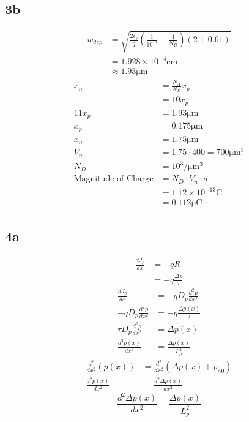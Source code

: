 \documentclass{article}
\begin{document}
\begin{multicols}{2}
    \subsection*{3b}
    \begin{align*}
        w_{dep} & = \sqrt{\frac{2\epsilon_s}{q}\left({\frac{1}{10^{10}}+\frac{1}{N_D}}\right)\left(2+0.61\right)} \\
                & = 1.928\times10^{-4}\si{\centi\metre}                                                           \\
                & \approx 1.93 \si{\micro\metre}
    \end{align*}
    \begin{align*}
        x_n                        & = \frac{N_A}{N_D}x_p                          \\
                                   & = 10 x_p                                      \\
        11x_p                      & = 1.93 \si{\micro\metre}                      \\
        x_p                        & = 0.175 \si{\micro\metre}                     \\
        x_n                        & = 1.75 \si{\micro\metre}                      \\
        V_n                        & = 1.75\cdot 400 = 700 \si{\micro\metre\cubed} \\
        N_D                        & = 10^3 \si{\per\micro\metre\cubed}            \\
        \text{Magnitude of Charge} & = N_D \cdot V_n \cdot q                       \\
                                   & = 1.12\times 10 ^{-13} \si{\coulomb}          \\
                                   & = 0.112 \si{\pico\coulomb}
    \end{align*}
    \pagebreak
    \subsection*{4a}
    \begin{align*}
        \frac{d J_p}{dx} & = -qR                      \\
                         & = -q \frac{\Delta p}{\tau}
    \end{align*}
    \begin{align*}
        \frac{dJ_p}{dx}            & = -q D_p \frac{d^2 p}{d x^2}  \\
        -q D_p \frac{d^2p}{dx^2}   & = -q \frac{\Delta p(x)}{\tau} \\
        \tau D_p \frac{d^2p}{dx^2} & = \Delta p(x)                 \\
        \frac{d^2 p(x)}{dx^2}      & = \frac{\Delta p(x)}{L_p^2}
    \end{align*}
    \begin{align*}
        \frac{d^2}{dx^2}\left( p(x) \right) & = \frac{d^2}{dx^2}\left( \Delta p(x) + p_{n0} \right) \\
        \frac{d^2 p(x)}{dx^2}               & = \frac{d^2\Delta p(x)}{dx^2}
    \end{align*}
    \[\boxed{\frac{d^2\Delta p(x)}{dx^2} = \frac{\Delta p(x)}{L_p^2}}\]

\end{multicols}
\end{document}

